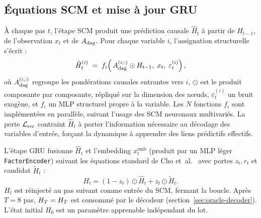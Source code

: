 \subsection{Équations SCM et mise à jour GRU}
\label{ssec:oracle-rcn-scm}

À chaque pas $t$, l'étape SCM produit une prédiction causale $\hat{H}_t$ à partir de $H_{t-1}$, de l'observation $x_t$ et de $A_{\mathrm{dag}}$. Pour chaque variable $i$, l'assignation structurelle s'écrit :
\begin{equation}
  \hat{H}_t^{(i)} \;=\; f_i\!\left(\, A_{\mathrm{dag}}^{(i,:)} \odot H_{t-1},\; x_t,\; \varepsilon_t^{(i)} \right),
  \label{eq:scm-update}
\end{equation}
où $A_{\mathrm{dag}}^{(i,:)}$ regroupe les pondérations causales entrantes vers $i$, $\odot$ est le produit composante par composante, répliqué sur la dimension des nœuds, $\varepsilon_t^{(i)}$ un bruit exogène, et $f_i$ un MLP structurel propre à la variable. Les $N$ fonctions $f_i$ sont implémentées en parallèle, suivant l'usage des SCM neuronaux multivariés. La perte $\mathcal{L}_{\mathrm{rec}}$ contraint $\hat{H}_t$ à porter l'information nécessaire au décodage des variables d'entrée, forçant la dynamique à apprendre des liens prédictifs effectifs.

L'étape GRU fusionne $\hat{H}_t$ et l'embedding $x_t^{\mathrm{emb}}$ (produit par un MLP léger \texttt{FactorEncoder}) suivant les équations standard de Cho et~al.~\cite{cho_gru_2014} avec portes $z_t, r_t$ et candidat $\tilde{H}_t$ :
\begin{equation}
  H_t = (1 - z_t) \odot \hat{H}_t + z_t \odot \tilde{H}_t.
  \label{eq:gru-h}
\end{equation}
$H_t$ est réinjecté au pas suivant comme entrée du SCM, fermant la boucle. Après $T=8$ pas, $H_T = H_T$ est consommé par le décodeur (section~\ref{sec:oracle-decoder}). L'état initial $H_0$ est un paramètre apprenable indépendant du lot.

\label{sec:oracle-dagma}

